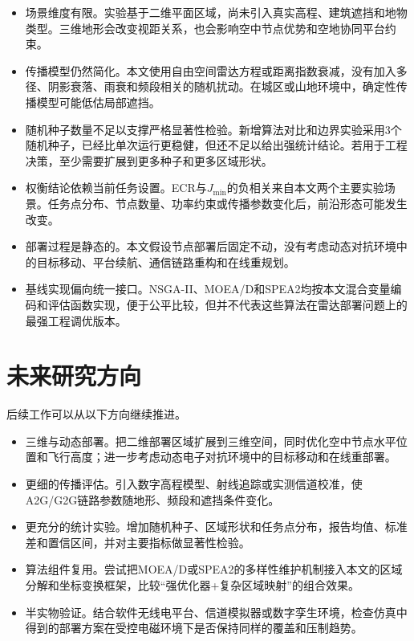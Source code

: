 \begin{itemize}
    \item 场景维度有限。实验基于二维平面区域，尚未引入真实高程、建筑遮挡和地物类型。三维地形会改变视距关系，也会影响空中节点优势和空地协同平台约束。

    \item 传播模型仍然简化。本文使用自由空间雷达方程或距离指数衰减，没有加入多径、阴影衰落、雨衰和频段相关的随机扰动。在城区或山地环境中，确定性传播模型可能低估局部遮挡。

    \item 随机种子数量不足以支撑严格显著性检验。新增算法对比和边界实验采用3个随机种子，已经比单次运行更稳健，但还不足以给出强统计结论。若用于工程决策，至少需要扩展到更多种子和更多区域形状。

    \item 权衡结论依赖当前任务设置。ECR与$J_{\min}$的负相关来自本文两个主要实验场景。任务点分布、节点数量、功率约束或传播参数变化后，前沿形态可能发生改变。

    \item 部署过程是静态的。本文假设节点部署后固定不动，没有考虑动态对抗环境中的目标移动、平台续航、通信链路重构和在线重规划。

    \item 基线实现偏向统一接口。NSGA-II、MOEA/D和SPEA2均按本文混合变量编码和评估函数实现，便于公平比较，但并不代表这些算法在雷达部署问题上的最强工程调优版本。
\end{itemize}

\section{未来研究方向}

后续工作可以从以下方向继续推进。

\begin{itemize}
    \item 三维与动态部署。把二维部署区域扩展到三维空间，同时优化空中节点水平位置和飞行高度；进一步考虑动态电子对抗环境中的目标移动和在线重部署。

    \item 更细的传播评估。引入数字高程模型、射线追踪或实测信道校准，使A2G/G2G链路参数随地形、频段和遮挡条件变化。

    \item 更充分的统计实验。增加随机种子、区域形状和任务点分布，报告均值、标准差和置信区间，并对主要指标做显著性检验。

    \item 算法组件复用。尝试把MOEA/D或SPEA2的多样性维护机制接入本文的区域分解和坐标变换框架，比较“强优化器+复杂区域映射”的组合效果。

    \item 半实物验证。结合软件无线电平台、信道模拟器或数字孪生环境，检查仿真中得到的部署方案在受控电磁环境下是否保持同样的覆盖和压制趋势。
\end{itemize}
